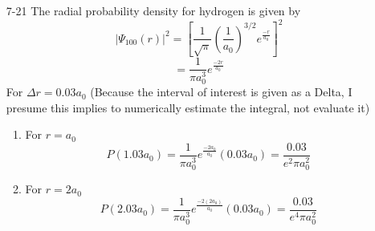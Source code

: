 \documentclass[]{2620hw}
\begin{document}
\begin{enumerate}
\item [7-21] The radial probability density for hydrogen is given by 
\[
	 |\Psi_{100}(r)|^2= \left[ \frac{1}{\sqrt{\pi}} \left( \frac{1}{a_0} \right)^{3/2}e^{\frac{-r}{a_0}}  \right]^2
\]
\[
	 = \frac{1}{\pi a_0^3}e^{\frac{-2r}{a_0}}
\]
For $\Delta r = 0.03a_0$ (Because the interval of interest is given as a Delta, I presume this implies  to numerically estimate the integral, not evaluate it)
\begin{enumerate}
	\item For $r=a_0$
	\[ 
		P(1.03a_0) = \frac{1}{\pi a_0^3}e^{\frac{-2a_0}{a_0}} ( 0.03a_0) = \frac{0.03}{e^2 \pi a_0^2}
	\]
	\item For $r = 2a_0$
	\[
		P(2.03a_0) = \frac{1}{\pi a_0^3}e^{\frac{-2(2a_0)}{a_0}} ( 0.03a_0) = \frac{0.03}{e^4 \pi a_0^2}
	\]
\end{enumerate}

\end{enumerate}
\end{document}
